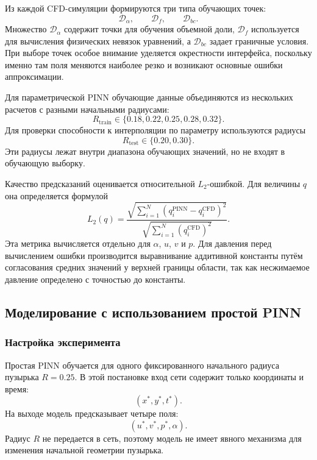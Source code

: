 \documentclass[12pt,a4paper]{article}
\begin{document}
Из каждой CFD-симуляции формируются три типа обучающих точек:
\[
    \mathcal{D}_\alpha,\qquad
    \mathcal{D}_f,\qquad
    \mathcal{D}_{bc}.
\]
Множество \(\mathcal{D}_\alpha\) содержит точки для обучения объемной доли,
\(\mathcal{D}_f\) используется для вычисления физических невязок уравнений, а
\(\mathcal{D}_{bc}\) задает граничные условия. При выборе точек особое внимание
уделяется окрестности интерфейса, поскольку именно там поля меняются наиболее
резко и возникают основные ошибки аппроксимации.

Для параметрической PINN обучающие данные объединяются из нескольких расчетов с
разными начальными радиусами:
\[
    R_{\mathrm{train}}\in\{0.18,0.22,0.25,0.28,0.32\}.
\]
Для проверки способности к интерполяции по параметру используются радиусы
\[
    R_{\mathrm{test}}\in\{0.20,0.30\}.
\]
Эти радиусы лежат внутри диапазона обучающих значений, но не входят в обучающую
выборку.

Качество предсказаний оценивается относительной \(L_2\)-ошибкой. Для величины
\(q\) она определяется формулой
\begin{equation}
    L_2(q)
    =
    \frac{\sqrt{\sum_{i=1}^{N}(q_i^{\mathrm{PINN}}-q_i^{\mathrm{CFD}})^2}}
         {\sqrt{\sum_{i=1}^{N}(q_i^{\mathrm{CFD}})^2}}.
    \label{eq:chapter3_l2}
\end{equation}
Эта метрика вычисляется отдельно для \(\alpha\), \(u\), \(v\) и \(p\). Для
давления перед вычислением ошибки производится выравнивание аддитивной
константы путём согласования средних значений у верхней границы области, так
как несжимаемое давление определено с точностью до константы.

\subsection{Моделирование с использованием простой PINN}

\subsubsection{Настройка эксперимента}

Простая PINN обучается для одного фиксированного начального радиуса пузырька
\(R=0.25\). В этой постановке вход сети содержит только координаты и время:
\[
    (x^*,y^*,t^*).
\]
На выходе модель предсказывает четыре поля:
\[
    (u^*,v^*,p^*,\alpha).
\]
Радиус \(R\) не передается в сеть, поэтому модель не имеет явного механизма для
изменения начальной геометрии пузырька.
\end{document}
